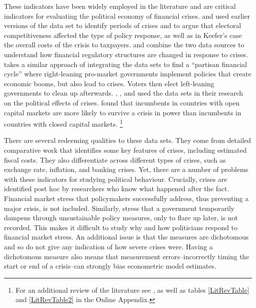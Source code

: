 \documentclass[]{article}
\begin{document}
These indicators have been widely employed in the literature and are critical indicators for evaluating the political economy of financial crises. \cite{Keefer2007} and \cite{Rosas2006,Rosas2009} used earlier versions of the \cite{laeven2013} data set to identify periods of crises and to argue that electoral competitiveness affected the type of policy response, as well as in Keefer's case the overall costs of the crisis to taxpayers. \cite{Gandrud2013,Gandrud2014} and \cite{Kleibl2013} combine the two data sources to understand how financial regulatory structures are changed in response to crises. \cite{broz2013} takes a similar approach of integrating the data sets to find a ``partisan financial cycle'' where right-leaning pro-market governments implement policies that create economic booms, but also lead to crises. Voters then elect left-leaning governments to clean up afterwards. \cite{CrespoTenorio2014}, \cite{Chwieroth2013}, and \cite{Pepinsky2012} used the data sets in their research on the political effects of crises. \cite{CrespoTenorio2014} found that incumbents in countries with open capital markets are more likely to survive a crisis in power than incumbents in countries with closed capital markets. \footnote{For an additional review of the literature see \cite{GandrudHallerberg2015}, as well as tables \ref{LitRevTable} and \ref{LitRevTable2} in the Online Appendix.}

There are several redeeming qualities to these data sets. They come from detailed comparative work that identifies some key features of crises, including estimated fiscal costs. They also differentiate across different types of crises, such as exchange rate, inflation, and banking crises. Yet, there are a number of problems with these indicators for studying political behaviour. Crucially, crises are identified post hoc by researchers who know what happened after the fact. Financial market stress that policymakers successfully address, thus preventing a major crisis, is not included. Similarly, stress that a government temporarily dampens through unsustainable policy measures, only to flare up later, is not recorded. This makes it difficult to study why and how politicians respond to financial market stress. An additional issue is that the measures are dichotomous and so do not give any indication of how severe crises were. Having a dichotomous measure also means that measurement errors--incorrectly timing the start or end of a crisis--can strongly bias econometric model estimates.
\end{document}
